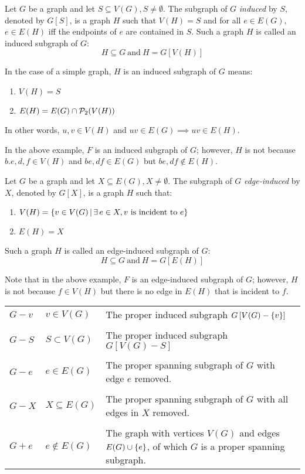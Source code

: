 \documentclass[letterpaper,12pt,fleqn]{article}
\begin{document}
\begin{definition}[Induced]
  Let \(G\) be a graph and let \(S\subseteq V(G), S\ne\emptyset\).  The subgraph of \(G\) \emph{induced} by \(S\),
  denoted by \(G[S]\), is a graph \(H\) such that \(V(H)=S\) and for all \(e\in E(G)\), \(e\in E(H)\) iff the
  endpoints of \(e\) are contained in \(S\).  Such a graph \(H\) is called an induced subgraph of \(G\):
  \[H\subseteq G\ \text{and}\ H=G[V(H)]\]

  In the case of a simple graph, \(H\) is an induced subgraph of \(G\) means:
  \begin{enumerate}
  \item \(V(H)=S\)
  \item \(E(H)=E(G)\cap\mathcal{P}_2(V(H))\)
  \end{enumerate}
  In other words, \(u,v\in V(H)\) and \(uv\in E(G)\implies uv\in E(H)\).
\end{definition}

In the above example, \(F\) is an induced subgraph of \(G\); however, \(H\) is not because \(b.e,d,f\in V(H)\) and
\(be,df\in E(G)\) but \(be,df\notin E(H)\).

\begin{definition}
  Let \(G\) be a graph and let \(X\subseteq E(G), X\ne\emptyset\).  The subgraph of \(G\) \emph{edge-induced} by
  \(X\), denoted by \(G[X]\), is a graph \(H\) such that:
  \begin{enumerate}
  \item \(V(H)=\left\{{v\in V(G)}\,\middle|\,{\exists\,e\in X,v\ \text{is incident to}\ e}\right\}\)
  \item \(E(H)=X\)
  \end{enumerate}
  Such a graph \(H\) is called an edge-induced subgraph of \(G\):
  \[H\subseteq G\ \text{and}\ H=G[E(H)]\]
\end{definition}

Note that in the above example, \(F\) is an edge-induced subgraph of \(G\); however, \(H\) is not because \(f\in
V(H)\) but there is no edge in \(E(H)\) that is incident to \(f\).

\begin{notation}
  \begin{tabular}{llp{4.5in}}
    \(G-v\) & \(v\in V(G)\) & The proper induced subgraph \(G\left[V(G)-\{v\}\right]\) \\
    \\
    \(G-S\) & \(S\subset V(G)\) & The proper induced subgraph \(G\left[V(G)-S\right]\) \\
    \\
    \(G-e\) & \(e\in E(G)\) & The proper spanning subgraph of \(G\) with edge \(e\) removed. \\
    \\
    \(G-X\) & \(X\subseteq E(G)\) & The proper spanning subgraph of \(G\) with all edges in \(X\) removed. \\
    \\
    \(G+e\) & \(e\notin E(G)\) & The graph with vertices \(V(G)\) and edges \(E(G)\cup\{e\}\), of which \(G\) is a
    proper spanning subgraph. \\
  \end{tabular}
\end{notation}
\end{document}
